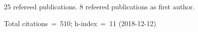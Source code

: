 25 refereed publications. 8 refeered publications as first author.

Total citations~=~510; h-index~=~11 (2018-12-12)